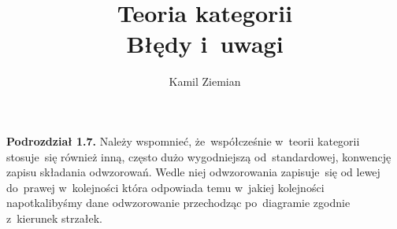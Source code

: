 


\usepackage{tikz}

\usetikzlibrary{decorations.markings}

\usepackage{TikZPics}

\usepackage{TikZStyles}










\title{Teoria kategorii \\
  {\Large Błędy i~uwagi}}

\author{Kamil Ziemian}


















\maketitle %






\vspace{0em}



\vspace{0em}


\noindent
\textbf{Podrozdział 1.7.} Należy wspomnieć, że~współcześnie w~teorii
kategorii stosuje~się również inną, często dużo wygodniejszą
od~standardowej, konwencję zapisu składania odwzorowań. Wedle niej
odwzorowania zapisuje~się od lewej do~prawej w~kolejności która odpowiada
temu w~jakiej kolejności napotkalibyśmy dane odwzorowanie przechodząc
po~diagramie zgodnie z~kierunek strzałek.

